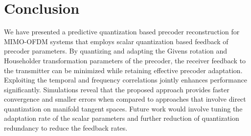 \documentclass[journal,10pt,twocolumn]{IEEEtran}
\begin{document}




\section{Conclusion}
\label{section4}
We have presented a predictive quantization based precoder
reconstruction for MIMO-OFDM systems that employs scalar quantization
based feedback of precoder parameters. By quantizing and adapting the
Givens rotation and Householder transformation parameters of the
precoder, the receiver feedback to the transmitter can be minimized
while retaining effective precoder adaptation. Exploiting the temporal
and frequency correlations jointly enhances performance
significantly. Simulations reveal that the proposed approach provides
faster convergence and smaller errors when compared to
approaches that involve direct quantization on manifold tangent
spaces. Future work would involve tuning the adaptation rate of the
scalar parameters and further reduction of quantization redundancy to
reduce the feedback rates.
\end{document}
